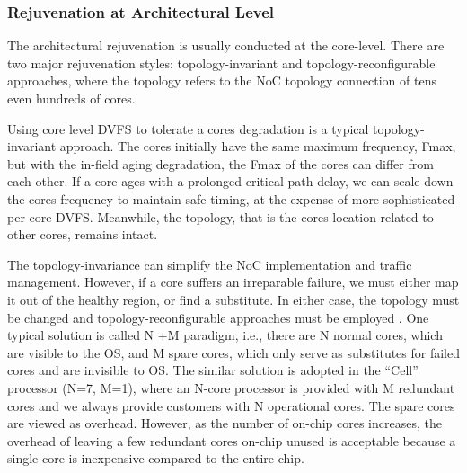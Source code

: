 \subsubsection{Rejuvenation at Architectural Level}
The architectural rejuvenation is usually conducted at the core-level. There are two major rejuvenation styles: topology-invariant and topology-reconfigurable approaches, where the topology refers to the NoC topology connection of tens even hundreds of cores. 

Using core level DVFS to tolerate a cores degradation is a typical topology-invariant approach. The cores initially have the same maximum frequency, Fmax, but with the in-field aging degradation, the Fmax of the cores can differ from each other. If a core ages with a prolonged critical path delay, we can scale down the cores frequency to maintain safe timing, at the expense of more sophisticated per-core DVFS. Meanwhile, the topology, that is the cores location related to other cores, remains intact. 

The topology-invariance can simplify the NoC implementation and traffic management. However, if a core suffers an irreparable failure, we must either map it out of the healthy region, or find a substitute. In either case, the topology must be changed and topology-reconfigurable approaches must be employed \cite{fu2011abacus} \cite{zhang2009topology}. One typical solution is called N +M paradigm, i.e., there are N normal cores, which are visible to the OS, and M spare cores, which only serve as substitutes for failed cores and are invisible to OS. The similar solution is adopted in the “Cell” processor (N=7, M=1), where an N-core processor is provided with M redundant cores and we always provide customers with N operational cores. The spare cores are viewed as overhead. However, as the number of on-chip cores increases, the overhead of leaving a few redundant cores on-chip unused is acceptable because a single core is inexpensive compared to the entire chip. 

